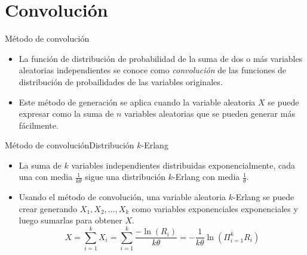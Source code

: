 \section{Convolución}

\begin{frame}{Método de convolución}
    \begin{itemize}
        \item La función de distribución de probabilidad de la suma de dos o más variables aleatorias independientes se conoce como \textit{convolución} de las funciones de distribución de probailidades de las variables originales.
        \item Este método de generación se aplica cuando la variable aleatoria $X$ se puede expresar como la suma de $n$ variables aleatorias que se pueden generar más fácilmente.%
        
    \end{itemize}
\end{frame}

\begin{frame}{Método de convolución}{Distribución $k$-Erlang}
    \begin{itemize}
        \item La suma de $k$ variables independientes distribuidas exponencialmente, cada una con media $\frac{1}{k\theta}$ sigue una distribución $k$-Erlang con media $\frac{1}{\theta}$.
        \item Usando el método de convolución, una variable aleatoria $k$-Erlang se puede crear generando $X_1, X_2, \dots , X_k$ como variables exponenciales exponenciales y luego sumarlas para obtener $X$.
        \begin{equation*}
            X=\sum_{i=1}^{k} X_i = \sum_{i=1}^{k}{\frac{-\ln{ (R_i)}}{k\theta}}=-\frac{1}{k \theta} \ln{\left(\Pi_{i=1}^{k}{R_i}\right)}
        \end{equation*}
    \end{itemize}
\end{frame}
